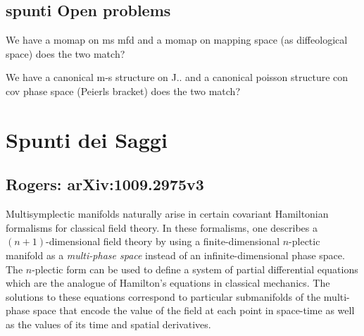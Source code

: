 \documentclass[a4paper,12pt,fleqn]{scrartcl}  %
\begin{document}
\subsection{spunti Open problems}
	We have a momap on ms mfd and a momap on mapping space (as diffeological space) does the two match?
	
	We have a canonical m-s structure on J.. and a canonical poisson structure con cov phase space (Peierls bracket) does the two match?

\section{Spunti dei Saggi}
\subsection{Rogers: arXiv:1009.2975v3}
Multisymplectic manifolds naturally arise in certain covariant Hamiltonian formalisms for classical field theory.
In these formalisms, one describes a $(n+1)$-dimensional field theory by using a finite-dimensional $n$-plectic manifold as a \emph{multi-phase space} instead of an infinite-dimensional phase space. 
The $n$-plectic form can be used to define a system of partial differential equations which are the analogue of Hamilton's equations in classical mechanics. 
The solutions to these
equations correspond to particular submanifolds of the multi-phase space that encode the value of the field at each point in space-time as well as the values of its time and spatial derivatives.
\end{document}
